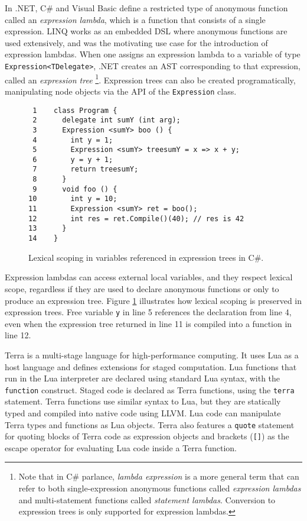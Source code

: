 \documentclass[english]{llncs}
\begin{document}
In .NET, C\# and Visual Basic define a restricted type of anonymous
function called an \emph{expression lambda}, which is a function that
consists of a single expression. LINQ works as an embedded DSL
\cite{Fowler:2010:DSL:1809745} where anonymous functions are used
extensively, and was the motivating use case for the introduction
of expression lambdas. When one assigns an expression lambda to a variable
of type \texttt{Expression<TDelegate>}, .NET creates an AST
corresponding to that expression, called an \emph{expression tree}
\footnote{Note that in C\# parlance, \emph{lambda expression} is a
more general term that can refer to both single-expression anonymous functions
called \emph{expression lambdas} and multi-statement functions called
\emph{statement lambdas}. Conversion to expression trees is only supported for
expression lambdas.}. Expression trees can also be created 
programatically, manipulating node objects via the API of the
\texttt{Expression} class.

\begin{figure}[t]
\begin{verbatim}
 1    class Program {
 2      delegate int sumY (int arg);
 3      Expression <sumY> boo () {
 4        int y = 1;
 5        Expression <sumY> treesumY = x => x + y;
 6        y = y + 1;
 7        return treesumY;
 8      }
 9      void foo () {
10        int y = 10;
11        Expression <sumY> ret = boo();
12        int res = ret.Compile()(40); // res is 42
13      }
14    }
\end{verbatim}
\protect\caption{\label{fig:ExpressionTrees}Lexical scoping in variables
referenced in expression trees in C\#.}
\end{figure}

Expression lambdas can access external local variables, and they respect
lexical scope, regardless if they are used to declare anonymous functions or
only to produce an expression tree. Figure
\ref{fig:ExpressionTrees} illustrates how lexical scoping is preserved in
expression trees. Free variable \texttt{y} in line 5 references the declaration
from line 4, even when the expression tree returned in line 11 is compiled
into a function in line 12.

Terra \cite{DeVito2013Terra} is a multi-stage language for high-performance
computing. It uses Lua as a host language and defines extensions
for staged computation. Lua functions that run in the Lua interpreter are
declared using standard Lua syntax, with the \texttt{function} construct.
Staged code is declared as Terra functions, using the \texttt{terra}
statement. Terra functions use similar syntax to Lua, but they are statically
typed and compiled into native code using LLVM. Lua code can manipulate Terra
types and functions as Lua objects. Terra also features a \texttt{quote} statement
for quoting blocks of Terra code as expression objects and brackets
(\texttt{[]}) as the escape operator for evaluating Lua code inside a Terra
function.
\end{document}
